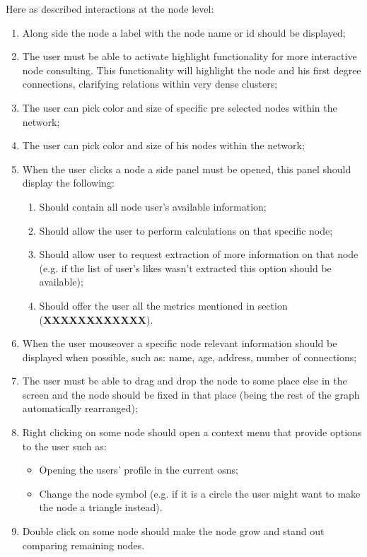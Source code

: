 Here as described interactions at the node level:
\begin{enumerate}
    \item Along side the node a label with the node name or id should be displayed;
    \item The user must be able to activate highlight functionality for more interactive node consulting. This functionality will highlight the node
    and his first degree connections, clarifying relations within very dense clusters; %
    \item The user can pick color and size of specific pre selected nodes within the network;
    \item The user can pick color and size of his nodes within the network;
    \item When the user clicks a node a side panel must be opened, this panel should display the following:
    \begin{enumerate}
        \item Should contain all node user's available information;
        \item Should allow the user to perform calculations on that specific node;
        \item Should allow user to request extraction of more information on that node (e.g. if the list of user's likes wasn't extracted this option should be available);
        \item Should offer the user all the metrics mentioned in section (\textbf{XXXXXXXXXXXX}).
    \end{enumerate}
    \item When the user mouseover a specific node relevant information should be displayed when possible, such as: name, age, address, number of connections;
    \item The user must be able to drag and drop the node to some place else in the screen and the node should be fixed in that place (being the rest of the graph
    automatically rearranged);
    \item Right clicking on some node should open a context menu that provide options to the user such as:
    \begin{itemize}
        \item Opening the users' profile in the current \glspl{osn};
        \item Change the node symbol (e.g. if it is a circle the user might want to make the node a triangle instead). %
    \end{itemize}
    \item Double click on some node should make the node grow and stand out comparing remaining nodes. %
\end{enumerate}

